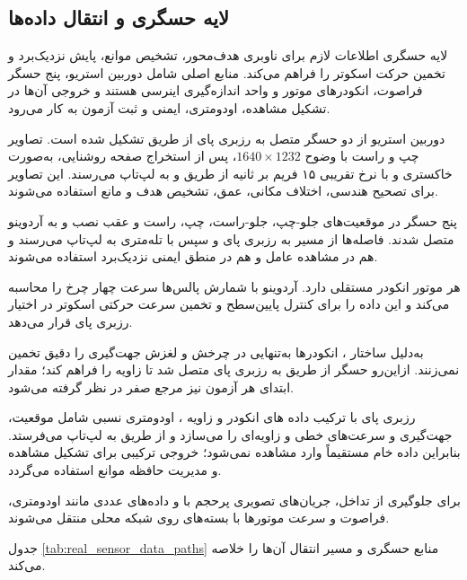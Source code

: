 \subsection{لایه حسگری و انتقال داده‌ها}
\label{subsec:sensing_and_data_transfer}

لایه حسگری اطلاعات لازم برای ناوبری هدف‌محور، تشخیص موانع، پایش نزدیک‌برد و تخمین حرکت اسکوتر را فراهم می‌کند. منابع اصلی شامل دوربین استریو، پنج حسگر فراصوت، انکودرهای موتور و واحد اندازه‌گیری اینرسی هستند و خروجی آن‌ها در تشکیل مشاهده، اودومتری، ایمنی و ثبت آزمون به کار می‌رود.

دوربین استریو از دو حسگر  متصل به رزبری پای از طریق  تشکیل شده است. تصاویر چپ و راست با وضوح $1640 \times 1232$، پس از استخراج صفحه روشنایی، به‌صورت خاکستری  و با نرخ تقریبی ۱۵ فریم بر ثانیه از طریق  و  به لپ‌تاپ می‌رسند. این تصاویر برای تصحیح هندسی، اختلاف مکانی، عمق، تشخیص هدف و مانع استفاده می‌شوند.

پنج حسگر  در موقعیت‌های جلو-چپ، جلو-راست، چپ، راست و عقب نصب و به آردوینو متصل شدند. فاصله‌ها از مسیر  به رزبری پای و سپس با تله‌متری  به لپ‌تاپ می‌رسند و هم در مشاهده عامل و هم در منطق ایمنی نزدیک‌برد استفاده می‌شوند.

هر موتور انکودر مستقلی دارد. آردوینو با شمارش پالس‌ها سرعت چهار چرخ را محاسبه می‌کند و این داده را برای کنترل پایین‌سطح و تخمین سرعت حرکتی اسکوتر در اختیار رزبری پای قرار می‌دهد.

به‌دلیل ساختار ، انکودرها به‌تنهایی در چرخش و لغزش جهت‌گیری را دقیق تخمین نمی‌زنند. ازاین‌رو حسگر  از طریق  به رزبری پای متصل شد تا زاویه  را فراهم کند؛ مقدار ابتدای هر آزمون نیز مرجع صفر در نظر گرفته می‌شود.

رزبری پای با ترکیب داده های انکودر و زاویه ، اودومتری نسبی شامل موقعیت، جهت‌گیری و سرعت‌های خطی و زاویه‌ای را می‌سازد و از طریق  به لپ‌تاپ می‌فرستد. بنابراین داده خام  مستقیماً وارد مشاهده نمی‌شود؛ خروجی ترکیبی برای تشکیل مشاهده و مدیریت حافظه موانع استفاده می‌گردد.

برای جلوگیری از تداخل، جریان‌های تصویری پرحجم با  و داده‌های عددی مانند اودومتری، فراصوت و سرعت موتورها با بسته‌های  روی شبکه محلی منتقل می‌شوند.

جدول \ref{tab:real_sensor_data_paths} منابع حسگری و مسیر انتقال آن‌ها را خلاصه می‌کند.

